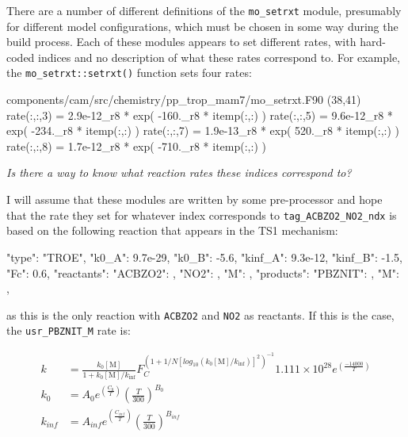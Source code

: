 \documentclass[titlepage]{article}
\begin{document}
There are a number of different definitions of the \verb>mo_setrxt> module, presumably for different model configurations, which must be chosen in some way during the build process. Each of these modules appears to set different rates, with hard-coded indices and no description of what these rates correspond to. For example, the \verb>mo_setrxt::setrxt()> function sets four rates:

\begin{blockcode}[commandchars=\\\{\}]
\color{gray}components/cam/src/chemistry/pp_trop_mam7/mo_setrxt.F90 (38,41)
      rate(:,:,3) = 2.9e-12_r8 * exp( -160._r8 * itemp(:,:) )
      rate(:,:,5) = 9.6e-12_r8 * exp( -234._r8 * itemp(:,:) )
      rate(:,:,7) = 1.9e-13_r8 * exp( 520._r8 * itemp(:,:) )
      rate(:,:,8) = 1.7e-12_r8 * exp( -710._r8 * itemp(:,:) )
\end{blockcode}

\vspace{30px}
\noindent\textit{\Large Is there a way to know what reaction rates these indices correspond to?}
\vspace{30px}

I will assume that these modules are written by some pre-processor and hope that the rate they set for whatever index corresponds to \verb>tag_ACBZO2_NO2_ndx> is based on the following reaction that appears in the TS1 mechanism:

\begin{blockcode}
        {
          "type": "TROE",
          "k0_A": 9.7e-29,
          "k0_B": -5.6,
          "kinf_A": 9.3e-12,
          "kinf_B": -1.5,
          "Fc": 0.6,
          "reactants": {
            "ACBZO2": { },
            "NO2": { },
            "M": { }
          },
          "products": {
            "PBZNIT": { },
            "M": { }
          }
        },
\end{blockcode}

\noindent as this is the only reaction with \verb>ACBZO2> and \verb>NO2> as reactants. If this is the case, the \verb>usr_PBZNIT_M> rate is:

\begin{equation}
\begin{split}
k & = \frac{k_0[\mbox{M}]}{1+k_0[\mbox{M}]/k_{\inf}}F_C^{(1+1/N[log_{10}(k_0[\mbox{M}]/k_{\inf})]^2)^{-1}} 1.111 \times 10^{28} e^{\left(\frac{-14000}{T}\right)}\\
k_0 & = A_0 e^{\left( \frac{C_0}{T} \right)} \left( \frac{T}{300} \right)^{B_0} \\
k_{inf} & = A_{inf} e^{\left( \frac{C_{inf}}{T} \right)} \left( \frac{T}{300} \right)^{B_{inf}}
\end{split}
\end{equation}
\end{document}
